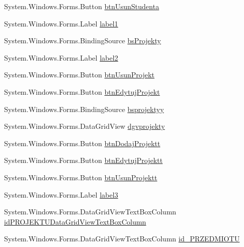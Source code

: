 \begin{DoxyCompactItemize}
\item 
System.\+Windows.\+Forms.\+Button \hyperlink{class_dziennik_ocen_1_1_form_prowadzacy_a1e61eed4407829503f9bcaa236a7d090}{btn\+Usun\+Studenta}
\item 
System.\+Windows.\+Forms.\+Label \hyperlink{class_dziennik_ocen_1_1_form_prowadzacy_a72199d1fd316d587834235d3ad31b240}{label1}
\item 
System.\+Windows.\+Forms.\+Binding\+Source \hyperlink{class_dziennik_ocen_1_1_form_prowadzacy_a1e25c6eb9309cb7bbdd229cbaea7d961}{bs\+Projekty}
\item 
System.\+Windows.\+Forms.\+Label \hyperlink{class_dziennik_ocen_1_1_form_prowadzacy_a4dce4ea456be76f21fcb0f1b9b5c6518}{label2}
\item 
System.\+Windows.\+Forms.\+Button \hyperlink{class_dziennik_ocen_1_1_form_prowadzacy_aa6ac131a793db6be81f3009e17bdee95}{btn\+Usun\+Projekt}
\item 
System.\+Windows.\+Forms.\+Button \hyperlink{class_dziennik_ocen_1_1_form_prowadzacy_ae8a91b72998abe6cee9bd541b6853101}{btn\+Edytuj\+Projekt}
\item 
System.\+Windows.\+Forms.\+Binding\+Source \hyperlink{class_dziennik_ocen_1_1_form_prowadzacy_a94fe0aa43a553db5d96022e42ba299c4}{bsprojektyy}
\item 
System.\+Windows.\+Forms.\+Data\+Grid\+View \hyperlink{class_dziennik_ocen_1_1_form_prowadzacy_aa8ce9306108e10e546d2e0c858207127}{dgvprojekty}
\item 
System.\+Windows.\+Forms.\+Button \hyperlink{class_dziennik_ocen_1_1_form_prowadzacy_aa27cfc76b930c1647c3e0902ded456c7}{btn\+Dodaj\+Projektt}
\item 
System.\+Windows.\+Forms.\+Button \hyperlink{class_dziennik_ocen_1_1_form_prowadzacy_a490ebb19c58f7f4320806656cc8fcc5b}{btn\+Edytuj\+Projektt}
\item 
System.\+Windows.\+Forms.\+Button \hyperlink{class_dziennik_ocen_1_1_form_prowadzacy_ac0c4ae6f72bee4e9fbc5e35fea1c9a81}{btn\+Usun\+Projektt}
\item 
System.\+Windows.\+Forms.\+Label \hyperlink{class_dziennik_ocen_1_1_form_prowadzacy_a1ef7707072a50d4c7f268eab9ff86c30}{label3}
\item 
System.\+Windows.\+Forms.\+Data\+Grid\+View\+Text\+Box\+Column \hyperlink{class_dziennik_ocen_1_1_form_prowadzacy_a37cdef588a3d89e847669f80869e489c}{id\+P\+R\+O\+J\+E\+K\+T\+U\+Data\+Grid\+View\+Text\+Box\+Column}
\item 
System.\+Windows.\+Forms.\+Data\+Grid\+View\+Text\+Box\+Column \hyperlink{class_dziennik_ocen_1_1_form_prowadzacy_a2f3562d595efd99137a56d8297ce2e35}{id\+\_\+\+P\+R\+Z\+E\+D\+M\+I\+O\+TU}

\end{DoxyCompactItemize}

